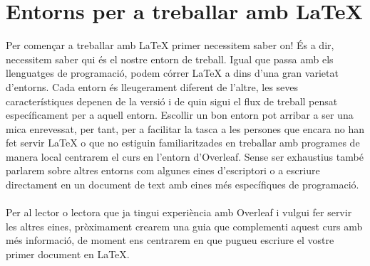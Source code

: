 \documentclass[15pt,twosides,onecolumn,openany]{book}
\begin{document}
\section{Entorns per a treballar amb LaTeX}
Per començar a treballar amb LaTeX primer necessitem saber on! És a dir, necessitem saber qui és el nostre entorn de treball. Igual que passa amb els llenguatges de programació, podem córrer LaTeX a dins d'una gran varietat d'entorns. Cada entorn és lleugerament diferent de l'altre, les seves característiques depenen de la versió i de quin sigui el flux de treball pensat específicament per a aquell entorn. Escollir un bon entorn pot arribar a ser una mica enrevessat, per tant, per a facilitar la tasca a les persones que encara no han fet servir LaTeX o que no estiguin familiaritzades en treballar amb programes de manera local centrarem el curs en l'entorn d'Overleaf. Sense ser exhaustius també parlarem sobre altres entorns com algunes eines d'escriptori o a escriure directament en un document de text amb eines més específiques de programació.\\\\
Per al lector o lectora que ja tingui experiència amb Overleaf i vulgui fer servir les altres eines, pròximament crearem una guia que complementi aquest curs amb més informació, de moment ens centrarem en que pugueu escriure el vostre primer document en LaTeX.
\end{document}
